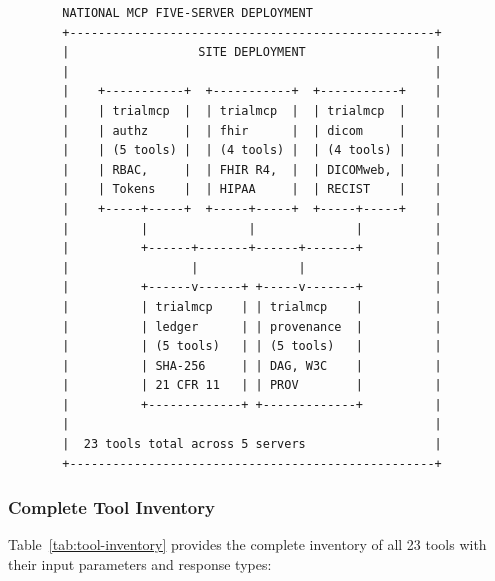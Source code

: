 \begin{figure}[H]
\begin{verbatim}
  NATIONAL MCP FIVE-SERVER DEPLOYMENT
  +---------------------------------------------------+
  |                  SITE DEPLOYMENT                  |
  |                                                   |
  |    +-----------+  +-----------+  +-----------+    |
  |    | trialmcp  |  | trialmcp  |  | trialmcp  |    |
  |    | authz     |  | fhir      |  | dicom     |    |
  |    | (5 tools) |  | (4 tools) |  | (4 tools) |    |
  |    | RBAC,     |  | FHIR R4,  |  | DICOMweb, |    |
  |    | Tokens    |  | HIPAA     |  | RECIST    |    |
  |    +-----+-----+  +-----+-----+  +-----+-----+    |
  |          |              |              |          |
  |          +------+-------+------+-------+          |
  |                 |              |                  |
  |          +------v------+ +-----v-------+          |
  |          | trialmcp    | | trialmcp    |          |
  |          | ledger      | | provenance  |          |
  |          | (5 tools)   | | (5 tools)   |          |
  |          | SHA-256     | | DAG, W3C    |          |
  |          | 21 CFR 11   | | PROV        |          |
  |          +-------------+ +-------------+          |
  |                                                   |
  |  23 tools total across 5 servers                  |
  +---------------------------------------------------+
\end{verbatim}
\end{figure}

\subsubsection{Complete Tool Inventory}

Table~\ref{tab:tool-inventory} provides the complete inventory of all 23 tools with their input parameters and response types:

